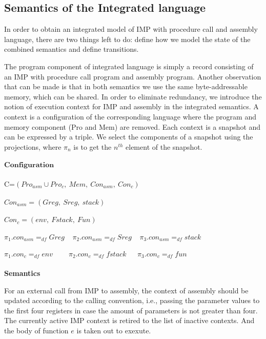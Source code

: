 \documentclass[conference]{IEEEtran}
\begin{document}
\subsection{Semantics of the Integrated language}
\par In order to obtain an integrated model of IMP with procedure call and assembly language, there are two things left to
do: define how we model the state of the combined semantics and define transitions.
\par The program component of integrated language is simply a record consisting of an IMP with procedure call program and assembly program. Another observation that can be made is that in both
semantics we use the same byte-addressable memory, which can be shared. In order to eliminate redundancy, we introduce the notion of execution context for IMP and assembly in the integrated semantics.  A context is a configuration of the corresponding language
where the program and memory component (Pro and Mem) are removed. Each context is a snapshot and can be expressed by a triple. We select the components of a snapshot using the projections, where $\pi_n$ is to get the $n^{th}$ element of the snapshot.\\ \\
$\textbf{Configuration}$\\ \\
C=$(Pro_{asm}\cup Pro_c,~Mem,~Con_{asm},~Con_{c})$\\ \\
$Con_{asm}=(Greg,~Sreg,~stack)$\\ \\
$Con_c=(env,~Fstack,~Fun)$\\ \\
$\pi_1.con_{asm}=_{df}Greg~~~~~\pi_2.con_{asm}=_{df}Sreg~~~~~\pi_3.con_{asm}=_{df}stack$\\ \\
$\pi_1.con_c=_{df}env~~~~~~~~~~\pi_2.con_c=_{df}fstack~~~~~~~\pi_3.con_c=_{df}fun$\\ \\
\textbf{Semantics}\\
\par For an external call from IMP to assembly, the context of assembly should be updated according to the calling convention, i.e., passing the parameter values to the first four registers in case the amount of parameters is not greater than four. The currently
active IMP context is retired to the list of inactive contexts. And the body of function $e$ is taken out to exexute.\\ \\
\end{document}
